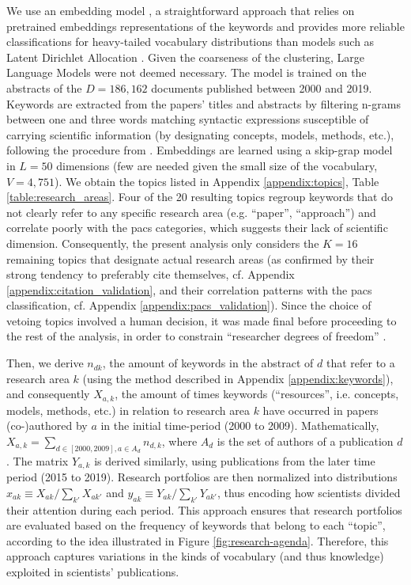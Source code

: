 \documentclass{article}
\begin{document}
We use an embedding model \citealt{Dieng2020}, a straightforward approach that relies on pretrained embeddings representations of the keywords and provides more reliable classifications for heavy-tailed vocabulary distributions than models such as Latent Dirichlet Allocation \citep{Blei2003}. Given the coarseness of the clustering, Large Language Models were not deemed necessary. 
The model is trained on the abstracts of the $D=186,162$ documents published between 2000 and 2019. Keywords are extracted from the papers' titles and abstracts by filtering n-grams between one and three words matching syntactic expressions susceptible of carrying scientific information (by designating concepts, models, methods, etc.), following the procedure from \citealt{Gautheron2023,omodei_tel-01097702}. Embeddings are learned using a skip-grap model in $L=50$ dimensions (few are needed given the small size of the vocabulary, $V=4,751$). We obtain the topics listed in Appendix \ref{appendix:topics}, Table \ref{table:research_areas}. Four of the 20 resulting topics regroup keywords that do not clearly refer to any specific research area (e.g. ``paper'', ``approach'') and correlate poorly with the \gls{pacs} categories, which suggests their lack of scientific dimension. Consequently, the present analysis only considers the $K=16$ remaining topics that designate actual research areas (as confirmed by their strong tendency to preferably cite themselves, cf. Appendix \ref{appendix:citation_validation}, and their correlation patterns with the \gls{pacs} classification, cf. Appendix \ref{appendix:pacs_validation}). Since the choice of vetoing topics involved a human decision, it was made final before proceeding to the rest of the analysis, in order to constrain ``researcher degrees of freedom'' \citep{simmons2011false}.

Then, we derive $n_{dk}$, the amount of keywords in the abstract of $d$ that refer to a research area $k$ (using the method described in Appendix \ref{appendix:keywords}), and consequently $X_{a,k}$, the amount of times keywords (``resources'', i.e. concepts, models, methods, etc.) in relation to research area $k$ have occurred in papers (co-)authored by $a$ in the initial time-period (2000 to 2009). Mathematically, $X_{a,k}=\sum_{d\in [2000,2009],a\in A_d} n_{d,k}$, where $A_d$ is the set of authors of a publication $d$. The matrix $Y_{a,k}$ is derived similarly, using publications from the later time period (2015 to 2019). Research portfolios are then normalized into distributions $x_{ak} \equiv X_{ak}/\sum_{k'} X_{ak'}$ and $y_{ak} \equiv Y_{ak}/\sum_{k'} Y_{ak'}$, thus encoding how scientists divided their attention during each period. This approach ensures that research portfolios are evaluated based on the frequency of keywords that belong to each ``topic'', according to the idea illustrated in Figure \ref{fig:research-agenda}. Therefore, this approach captures variations in the kinds of vocabulary (and thus knowledge) exploited in scientists' publications.
\end{document}
